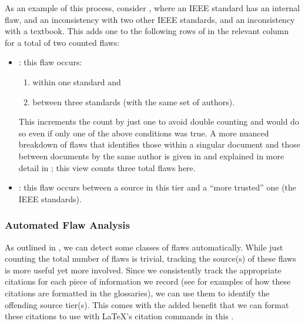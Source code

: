 \label{flaw-analysis-example}
As an example of this process, consider , where an
IEEE standard has an internal flaw, and an inconsistency with two other IEEE
standards, and an inconsistency with a textbook. This adds one to the following
rows of  in the relevant column for a total
of two counted flaws:

\begin{itemize}
    \item \textbf{\stds{}}: this flaw occurs:
          \begin{enumerate}
              \item within one standard and
              \item between three standards (with the same set of authors).
          \end{enumerate}
          This increments the count by just one to avoid double counting and
          would do so even if only one of the above conditions was true. A more
          nuanced breakdown of flaws that identifies those within a
          singular document and those between documents by the same author is
          given in  and explained in more detail in
          ; this view counts three total flaws here.
    \item \textbf{\texts{}}: this flaw occurs between a source in this tier and
          a ``more trusted'' one (the IEEE standards).
\end{itemize}

\subsubsection{Automated Flaw Analysis}
\label{auto-flaw-analysis}

As outlined in , we can detect some classes of flaws
automatically. While just counting the total number of flaws is trivial,
tracking the source(s) of these flaws is more useful yet more involved. Since
we consistently track the appropriate citations for each piece of information
we record (see  for examples
of how these citations are formatted in the glossaries), we can use them to
identify the offending source tier(s). This comes with the added benefit that
we can format these citations to use with \LaTeX{}'s citation commands in this
\docType{}.


